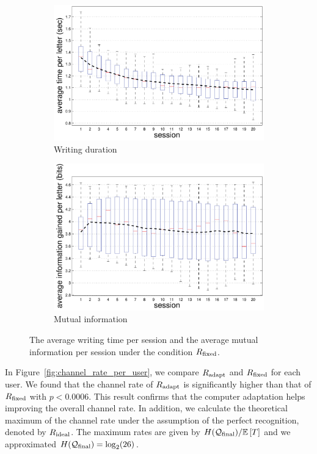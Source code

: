\documentclass{sigchi}
\begin{document}
\begin{figure}
  \centering
  \begin{subfigure}[b]{\columnwidth}
    \includegraphics[width=\columnwidth]{figures/IUI_duration_p_adapt.pdf}
    \caption{Writing duration}
    \label{fig:duration}
  \end{subfigure}
  \begin{subfigure}[b]{\columnwidth}
    \includegraphics[width=\columnwidth]{figures/IUI_total_logloss_p_first.pdf}
    \caption{Mutual information}
    \label{fig:mutual_information}
  \end{subfigure}
  \caption{The average writing time per session and the average mutual
    information per session under the condition $R_{\mathrm{fixed}}$.}
\end{figure}


In Figure~\ref{fig:channel_rate_per_user}, we compare $R_{\mathrm{adapt}}$ and
$R_{\mathrm{fixed}}$ for each user. We found that the channel rate of
$R_{\mathrm{adapt}}$ is significantly higher than that of $R_{\mathrm{fixed}}$ with $p <
0.0006$.  This result confirms that the computer adaptation helps
improving the overall channel rate. In addition, we calculate the
theoretical maximum of the channel rate under the assumption of the
perfect recognition, denoted by $R_{\mathrm{ideal}}$. The maximum rates are
given by $H(\mathcal{Q}_{\mathrm{final}}) / \mathbb{E} \left[T\right]$ and we approximated $H(\mathcal{Q}_{\mathrm{final}}) =
\log_2(26)$.
\end{document}
